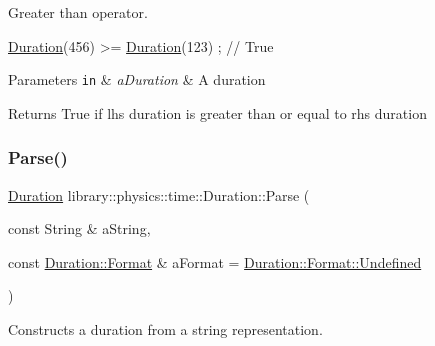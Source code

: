 Greater than operator. 


\begin{DoxyCode}
\hyperlink{classlibrary_1_1physics_1_1time_1_1_duration_a0a70efcf487a841da572afcf00001f64}{Duration}(456) >= \hyperlink{classlibrary_1_1physics_1_1time_1_1_duration_a0a70efcf487a841da572afcf00001f64}{Duration}(123) ; \textcolor{comment}{// True}
\end{DoxyCode}



\begin{DoxyParams}[1]{Parameters}
\mbox{\tt in}  & {\em a\+Duration} & A duration \\
\hline
\end{DoxyParams}
\begin{DoxyReturn}{Returns}
True if lhs duration is greater than or equal to rhs duration 
\end{DoxyReturn}
\mbox{\label{classlibrary_1_1physics_1_1time_1_1_duration_a52ba6dd2958d1e193b81d8f659bb6bf3}} 
\subsubsection{\texorpdfstring{Parse()}{Parse()}}
{\footnotesize\ttfamily \hyperlink{classlibrary_1_1physics_1_1time_1_1_duration}{Duration} library\+::physics\+::time\+::\+Duration\+::\+Parse (\begin{DoxyParamCaption}\item[{const String \&}]{a\+String,  }\item[{const \hyperlink{classlibrary_1_1physics_1_1time_1_1_duration_ace85659cafe97df992c0e4273bdc88d1}{Duration\+::\+Format} \&}]{a\+Format = {\ttfamily \hyperlink{classlibrary_1_1physics_1_1time_1_1_duration_ace85659cafe97df992c0e4273bdc88d1aec0fc0100c4fc1ce4eea230c3dc10360}{Duration\+::\+Format\+::\+Undefined}} }\end{DoxyParamCaption})\hspace{0.3cm}{\ttfamily [static]}}



Constructs a duration from a string representation. 



